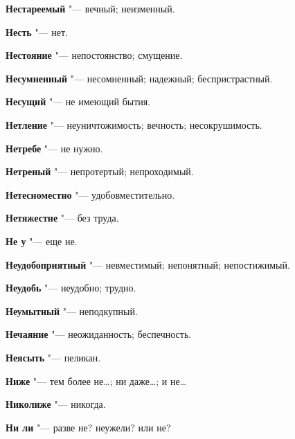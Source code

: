 \begin{mymulticols}{2}
\noindent\textbf{Нестареемый} "--- вечный; неизменный. 




\noindent\textbf{Несть} "--- нет. 




\noindent\textbf{Нестояние} "--- непостоянство; смущение. 




\noindent\textbf{Несумненный} "--- несомненный; надежный; беспристрастный. 




\noindent\textbf{Несущий} "--- не имеющий бытия. 




\noindent\textbf{Нетление} "--- неуничтожимость; вечность; несокрушимость. 




\noindent\textbf{Нетребе} "--- не нужно. 




\noindent\textbf{Нетреный} "--- непротертый; непроходимый. 




\noindent\textbf{Нетесноместно} "--- удобовместительно. 




\noindent\textbf{Нетяжестне} "--- без труда. 




\noindent\textbf{Не у} "--- еще не. 




\noindent\textbf{Неудобоприятный} "--- невместимый; непонятный; непостижимый. 




\noindent\textbf{Неудобь} "--- неудобно; трудно. 




\noindent\textbf{Неумытный} "--- неподкупный. 




\noindent\textbf{Нечаяние} "--- неожиданность; беспечность. 




\noindent\textbf{Неясыть} "--- пеликан. 




\noindent\textbf{Ниже} "--- тем более не…; ни даже…; и не… 




\noindent\textbf{Николиже} "--- никогда. 




\noindent\textbf{Ни ли} "--- разве не? неужели? или не? 





\end{mymulticols}

